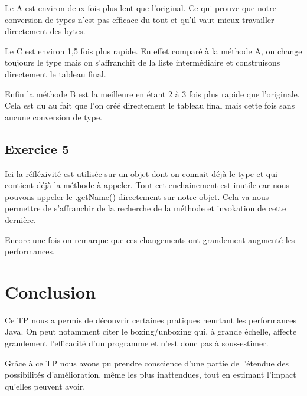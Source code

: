 \documentclass[12pt]{extreport}
\begin{document}
		
		
		Le A est environ deux fois plus lent que l'original.
		Ce qui prouve que notre conversion de types n'est pas efficace du tout et qu'il vaut mieux travailler directement des bytes.
		
		Le C est environ 1,5 fois plus rapide.
		En effet comparé à la méthode A, on change toujours le type mais on s'affranchit de la liste intermédiaire et construisons directement le tableau final.
		
		Enfin la méthode B est la meilleure en étant 2 à 3 fois plus rapide que l'originale.
		Cela est du au fait que l'on créé directement le tableau final mais cette fois sans aucune conversion de type.
	
	\section{Exercice 5}
		Ici la réfléxivité est utilisée sur un objet dont on connait déjà le type et qui contient déjà la méthode à appeler.
		Tout cet enchainement est inutile car nous pouvons appeler le .getName() directement sur notre objet.
		Cela va nous permettre de s'affranchir de la recherche de la méthode et invokation de cette dernière.
		
		
		
		Encore une fois on remarque que ces changements ont grandement augmenté les performances.
	
	\chapter{Conclusion}
		Ce TP nous a permis de découvrir certaines pratiques heurtant les performances Java.
		On peut notamment citer le boxing/unboxing qui, à grande échelle, affecte grandement l'efficacité d'un programme et n'est donc pas à sous-estimer.
		
		Grâce à ce TP nous avons pu prendre conscience d'une partie de l'étendue des possibilités d'amélioration, même les plus inattendues, tout en estimant l'impact qu'elles peuvent avoir.
	
\end{document}
